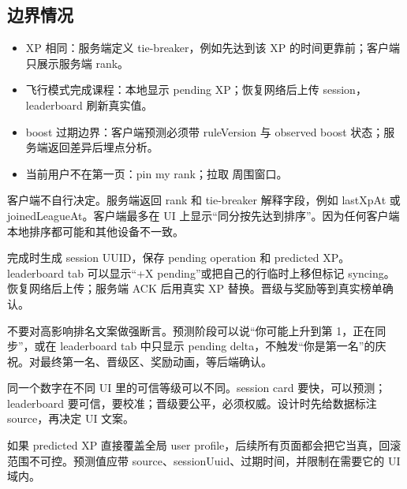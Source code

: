 \subsection{边界情况}

\begin{itemize}
  \item XP 相同：服务端定义 tie-breaker，例如先达到该 XP 的时间更靠前；客户端只展示服务端 rank。
  \item 飞行模式完成课程：本地显示 pending XP；恢复网络后上传 session，leaderboard 刷新真实值。
  \item boost 过期边界：客户端预测必须带 ruleVersion 与 observed boost 状态；服务端返回差异后埋点分析。
  \item 当前用户不在第一页：pin my rank；拉取  周围窗口。
\end{itemize}

\begin{followup}
客户端不自行决定。服务端返回 rank 和 tie-breaker 解释字段，例如 lastXpAt 或 joinedLeagueAt。客户端最多在 UI 上显示“同分按先达到排序”。因为任何客户端本地排序都可能和其他设备不一致。
\end{followup}

\begin{followup}
完成时生成 session UUID，保存 pending operation 和 predicted XP。leaderboard tab 可以显示“+X pending”或把自己的行临时上移但标记 syncing。恢复网络后上传；服务端 ACK 后用真实 XP 替换。晋级与奖励等到真实榜单确认。
\end{followup}

\begin{followup}[“如何避免短暂看到自己第一名然后掉下去？”]
不要对高影响排名文案做强断言。预测阶段可以说“你可能上升到第 1，正在同步”，或在 leaderboard tab 中只显示 pending delta，不触发“你是第一名”的庆祝。对最终第一名、晋级区、奖励动画，等后端确认。
\end{followup}

\begin{idea}[可迁移心法]
同一个数字在不同 UI 里的可信等级可以不同。session card 要快，可以预测；leaderboard 要可信，要校准；晋级要公平，必须权威。设计时先给数据标注 source，再决定 UI 文案。
\end{idea}

\begin{pitfall}[把预测值当作真值写进全局状态]
如果 predicted XP 直接覆盖全局 user profile，后续所有页面都会把它当真，回滚范围不可控。预测值应带 source、sessionUuid、过期时间，并限制在需要它的 UI 域内。
\end{pitfall}

